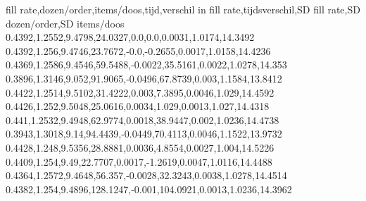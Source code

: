 fill rate,dozen/order,items/doos,tijd,verschil in fill rate,tijdsverschil,SD fill rate,SD dozen/order,SD items/doos
0.4392,1.2552,9.4798,24.0327,0.0,0.0,0.0031,1.0174,14.3492
0.4392,1.256,9.4746,23.7672,-0.0,-0.2655,0.0017,1.0158,14.4236
0.4369,1.2586,9.4546,59.5488,-0.0022,35.5161,0.0022,1.0278,14.353
0.3896,1.3146,9.052,91.9065,-0.0496,67.8739,0.003,1.1584,13.8412
0.4422,1.2514,9.5102,31.4222,0.003,7.3895,0.0046,1.029,14.4592
0.4426,1.252,9.5048,25.0616,0.0034,1.029,0.0013,1.027,14.4318
0.441,1.2532,9.4948,62.9774,0.0018,38.9447,0.002,1.0236,14.4738
0.3943,1.3018,9.14,94.4439,-0.0449,70.4113,0.0046,1.1522,13.9732
0.4428,1.248,9.5356,28.8881,0.0036,4.8554,0.0027,1.004,14.5226
0.4409,1.254,9.49,22.7707,0.0017,-1.2619,0.0047,1.0116,14.4488
0.4364,1.2572,9.4648,56.357,-0.0028,32.3243,0.0038,1.0278,14.4514
0.4382,1.254,9.4896,128.1247,-0.001,104.0921,0.0013,1.0236,14.3962
